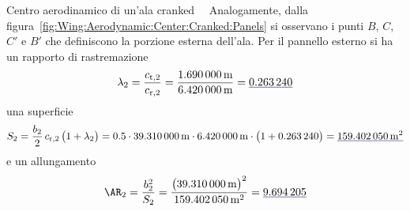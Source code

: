 \documentclass[[12pt,twoside]{book}
\begin{document}
\begin{myExampleX}{Centro aerodinamico di un'ala cranked}{\ \myIconGraph\ }
Analogamente, dalla figura~\ref{fig:Wing:Aerodynamic:Center:Cranked:Panels} si osservano
i punti $B$, $C$, $C'$ e $B'$ che definiscono la porzione esterna dell'ala.
Per il pannello esterno si ha un rapporto di rastremazione
\[
\lambda_2
  =\frac{c_{\mathrm{t},2}}{c_{\mathrm{r},2}}
  =\frac{\SI[round-precision=2]{\myChordTipWingIIMT}{\metre}}{\SI[round-precision=2]{\myChordRootWingIIMT}{\metre}}
  =\mathunderline{mydarkblue}{ \SI[round-precision=2]{\myTaperRatioWingII}{} }
\]
una superficie
\[
S_2 = \frac{b_2}{2} \, c_{\mathrm{r},2} \, \big( 1 + \lambda_2 \big)
  =
    \num{0.5} \cdot \SI[round-precision=1]{\mySpanWingIIMT}{\metre}
      \cdot \SI[round-precision=2]{\myChordRootWingIIMT}{\metre}
      \cdot \big( 1 + \SI[round-precision=2]{\myTaperRatioWingII}{} \big) 
    = \mathunderline{mydarkblue}{ \SI[round-precision=1]{\myAreaWingIIMTsquared}{\metre^2} }
\]
e un allungamento
\[
\AR_2 
  = \frac{b_2^2}{S_2}
  = \frac{\big(\SI[round-precision=1]{\mySpanWingIIMT}{\metre}\big)^2}{\SI[round-precision=1]{\myAreaWingIIMTsquared}{\metre^2}}
  = \mathunderline{mydarkblue}{ \num[round-precision=2]{\myAspectRatioWingII} }
\]


\end{myExampleX}
\end{document}
